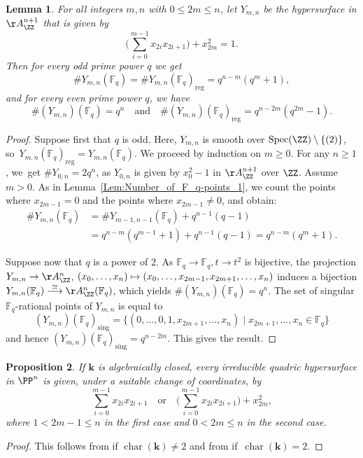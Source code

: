 \documentclass[JEP,XML,SOM,Unicode,NoFloatCountersInSection,published]{cedram}
\newcommand\mto{\mathchoice{\longmapsto}{\mapsto}{\mapsto}{\mapsto}}
\newcommand\quand{\quad\text{and}\quad}
\newtheorem{lemma}{Lemma}[section]
\newtheorem{proposition}[lemma]{Proposition}
\theoremstyle{definition}
\newcommand\iso{\stackrel{\simeq}{\longrightarrow}}
\renewcommand\k{{\mathbf k}}
\newcommand\FF{{\mathbb F}}
\newcommand{\kk}{\mathbf{k}}
\DeclareMathOperator{\car}{char}
\DeclareMathOperator{\sing}{sing}
\DeclareMathOperator{\reg}{reg}
\DeclareMathOperator{\Spec}{Spec}
\newcommand{\set}[2]{\{#1 \mid #2\}}
\begin{document}
\begin{lemma}
\label{Lem:Number_of_F_q-points_2}
For all integers $m,n$ with $0\le 2m\le n$,
let $Y_{m, n}$ be the hypersurface in $\AA^{n+1}_{\ZZ}$ that is given by
\[
\biggl(\sum_{i=0}^{m-1} x_{2i} x_{2i+1} \biggr) + x_{2m}^2 = 1.
\]
Then for every \emph{odd} prime power $q$ we get
\[
\# Y_{m, n}(\FF_q) = \# Y_{m, n}(\FF_q)_{\reg} = q^{n-m}(q^m+1),
\]
and for every \emph{even} prime power $q$, we have
\[
\# (Y_{m, n})(\FF_{q}) = q^n \quand \# (Y_{m, n})(\FF_{q})_{\reg} = q^{n-2m}(q^{2m}-1).
\]
\end{lemma}
\begin{proof}
Suppose first that $q$ is odd. Here, $Y_{m,n}$ is smooth over $\Spec(\ZZ) \setminus \{(2)\}$,
so~$Y_{m, n}(\FF_q)_{\reg} = Y_{m, n}(\FF_q)$.
We proceed by induction on $m \geq 0$. For any $n \geq 1$, we~get $\# Y_{0, n} = 2 q^{n}$,
as $Y_{0, n}$ is given by $x_0^2-1$ in $\AA^{n+1}_{\ZZ}$ over $\ZZ$. Assume $m > 0$.
As in Lemma~\ref{Lem:Number_of_F_q-points_1}, we count the points where $x_{2m-1}=0$ and the points where $x_{2m-1}\neq 0$, and obtain:
\begin{align*}
\# Y_{m, n}(\FF_q) &= \# Y_{m-1, n-1}(\FF_q) + q^{n-1}(q-1) \\
&= q^{n-m}(q^{m-1}+1) + q^{n-1}(q-1) = q^{n-m}(q^m + 1).
\end{align*}

Suppose now that $q$ is a power of $2$. As $\FF_{q}\to \FF_q, t\to t^2$ is bijective, the projection $Y_{m,n}\to \AA_{\ZZ}^n$, $(x_0, \ldots, x_n) \mto (x_0, \ldots, x_{2m-1}, x_{2m+1}, \ldots, x_n)$ induces a bijection $Y_{m,n}(\FF_q)\iso \AA_{\ZZ}^n(\FF_q)$,
which yields $\# (Y_{m, n})(\FF_{q}) = q^n $.
The set of singular $\FF_q$-rational points of $Y_{m, n}$ is equal to
\[
(Y_{m, n})(\FF_{q})_{\sing} = \set{ (0, \ldots, 0, 1, x_{2m+1}, \ldots, x_{n} ) }{
x_{2m+1}, \ldots, x_{n} \in \FF_{q} }
\]
and hence $(Y_{m, n})(\FF_{q})_{\sing} = q^{n-2m}$. This gives the result.
\end{proof}
\begin{proposition}\label{prop:QuadricProj}
If $\k$ is algebraically closed, every
irreducible quadric hypersurface in $\PP^n$ is given, under a suitable change of coordinates, by
\[
\sum_{i=0}^{m-1} x_{2i} x_{2i+1} \quad \textrm{or} \quad
\biggl( \sum_{i=0}^{m-1} x_{2i} x_{2i+1} \biggr) + x_{2m}^2,
\]
where $1 < 2m-1 \leq n$ in the first case and $0 < 2m \leq n$ in the second case.
\end{proposition}
\begin{proof} This follows from \cite[Th.\,1.8]{Pf1995Quadratic-forms-wi} if $\car(\k) \neq 2$ and from
\cite[Th.\,4.3]{Pf1995Quadratic-forms-wi} if~$\car(\kk) = 2$.
\end{proof}
\end{document}

